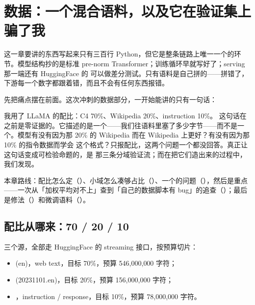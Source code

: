 \section{数据：一个混合语料，以及它在验证集上骗了我}
\label{sec:b-data}

这一章要讲的东西写起来只有三百行 Python，但它是整条链路上唯一一个的环节。模型结构抄的是标准 pre-norm Transformer；训练循环早就写好了；serving 那一端还有 HuggingFace 的  可以做差分测试。只有语料是自己拼的——拼错了，下游每一个数字都跟着错，而且不会有任何东西报错。

先把痛点摆在前面。这次冲刺的数据部分，一开始能讲的只有一句话：

\begin{misconception}{我用了 LLaMA 的配比：C4 70\%、Wikipedia 20\%、instruction 10\%。}
这句话在之前是零证据的。它描述的是一个——我们往语料里塞了多少字节——而不是一个。模型有没有因为那 20\% 的 Wikipedia 而在 Wikipedia 上更好？有没有因为那 10\% 的指令数据而学会  这个格式？只报配比，这两个问题一个都没回答。真正让这句话变成可检验命题的，是  那三条分域验证流；而在把它们造出来的过程中，我们发现。
\end{misconception}

本章路线：配比怎么定（）、小域怎么凑够占比（）、一个的问题（），然后是重点——一次从「加权平均对不上」查到「自己的数据脚本有 bug」的追查（）；最后是修法（）和微调语料（）。

\subsection{配比从哪来：70 / 20 / 10}
\label{subsec:ratio}

三个源，全部走 HuggingFace 的 streaming 接口，按预算切片：

\begin{itemize}\itemsep2pt
  \item {} (en)，web text，目标 70\%，预算 546{,}000{,}000 字符；
  \item {} (20231101.en)，目标 20\%，预算 156{,}000{,}000 字符；
  \item {}，instruction / response，目标 10\%，预算 78{,}000{,}000 字符。
\end{itemize}

